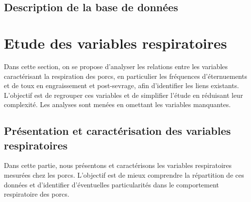 \documentclass{article}
\begin{document}
\subsection{Description de la base de données}
\newpage
\section{Etude des variables respiratoires}
Dans cette section, on se propose d’analyser les relations entre les variables caractérisant la respiration des porcs, en particulier les fréquences d’éternuements et de toux en engraissement et post-sevrage, afin d’identifier les liens existants. L’objectif est de regrouper ces variables et de simplifier l’étude en réduisant leur complexité. Les analyses sont menées en omettant les variables manquantes.
\subsection{Présentation et caractérisation des variables respiratoires}
Dans cette partie, nous présentons et caractérisons les variables respiratoires mesurées chez les porcs. L'objectif est de mieux comprendre la répartition de ces données et d'identifier d'éventuelles particularités dans le comportement respiratoire des porcs.
\end{document}
